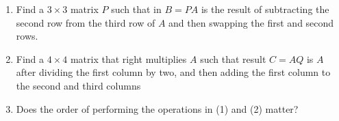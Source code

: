 \documentclass[11pt]{article}
\begin{document}
\begin{itemize}
\begin{examplebox}[1.1]
\begin{takeaways}[1.1]
\begin{enumerate}
	    \end{enumerate}
	\end{takeaways}
	\end{examplebox}
	\begin{examplebox}[1.2]\quad
	    \begin{enumerate}
			\item Find a $3 \times 3$ matrix $P$ such that in $B=PA$ is the result of subtracting the second row from the third row of $A$ and then swapping the first and second rows.
			\item Find a $4 \times 4$ matrix that right multiplies $A$ such that result $C=AQ$ is $A$ after dividing the first column by two, and then adding the first column to the second and third columns
			\item Does the order of performing the operations in (1) and (2) matter?
	    \end{enumerate}
		\begin{solution}[1.2]\quad\vspace{-0.5cm}
\end{solution}
\end{examplebox}
\end{itemize}
\end{document}
